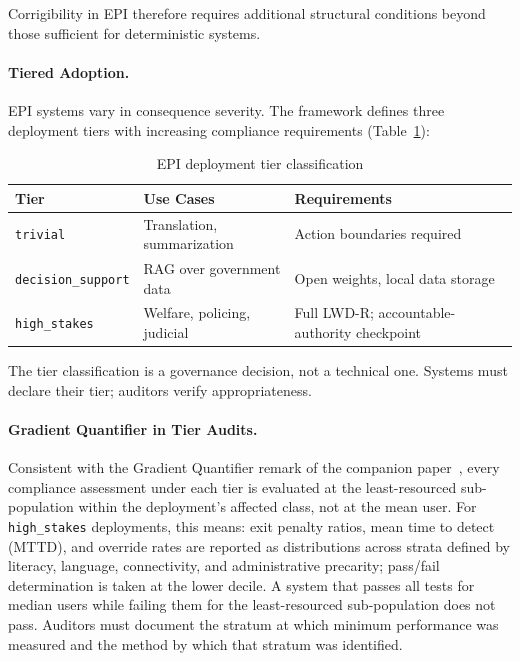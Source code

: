 \documentclass{article}
\theoremstyle{definition}
\begin{document}
Corrigibility in EPI therefore requires additional structural conditions beyond those sufficient for deterministic systems.

\paragraph{Tiered Adoption.} EPI systems vary in consequence severity. The framework defines three deployment tiers with increasing compliance requirements (Table~\ref{tab:epi-tiers}):

\begin{table}[htbp]
\centering
\caption{EPI deployment tier classification}
\label{tab:epi-tiers}
\begin{tabular}{@{}lll@{}}
\toprule
\textbf{Tier} & \textbf{Use Cases} & \textbf{Requirements} \\
\midrule
\texttt{trivial} & Translation, summarization & Action boundaries required \\
\texttt{decision\_support} & RAG over government data & Open weights, local data storage \\
\texttt{high\_stakes} & Welfare, policing, judicial & Full LWD-R; accountable-authority checkpoint \\
\bottomrule
\end{tabular}
\end{table}

The tier classification is a governance decision, not a technical one. Systems must declare their tier; auditors verify appropriateness.

\paragraph{Gradient Quantifier in Tier Audits.} Consistent with the Gradient Quantifier remark of the companion paper~\citep{aravind2026dpi}, every compliance assessment under each tier is evaluated at the least-resourced sub-population within the deployment's affected class, not at the mean user. For \texttt{high\_stakes} deployments, this means: exit penalty ratios, mean time to detect (MTTD), and override rates are reported as distributions across strata defined by literacy, language, connectivity, and administrative precarity; pass/fail determination is taken at the lower decile. A system that passes all tests for median users while failing them for the least-resourced sub-population does not pass. Auditors must document the stratum at which minimum performance was measured and the method by which that stratum was identified.
\end{document}
